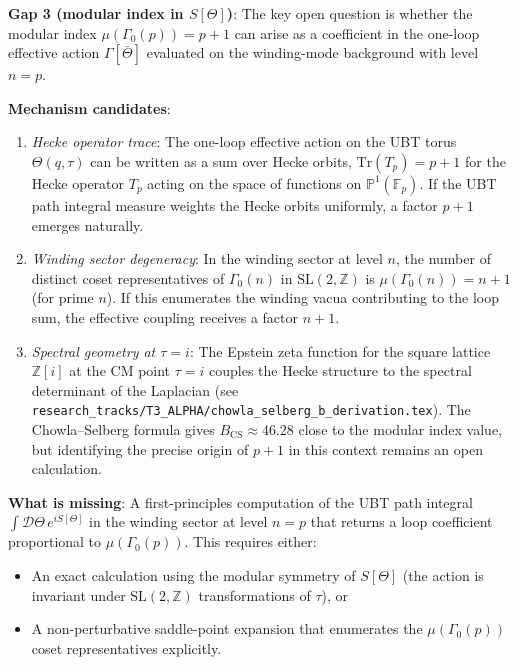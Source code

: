 \documentclass[12pt,a4paper]{article}
\theoremstyle{definition}
\theoremstyle{remark}
\begin{document}
\begin{gapbox}
\textbf{Gap 3 (modular index in $S[\Theta]$)}: The key open question is whether
the modular index $\mu(\Gamma_0(p)) = p+1$ can arise as a coefficient in the
one-loop effective action $\Gamma[\bar\Theta]$ evaluated on the winding-mode
background with level $n = p$.

\textbf{Mechanism candidates}:
\begin{enumerate}
  \item \textit{Hecke operator trace}: The one-loop effective action on the UBT
        torus $\Theta(q,\tau)$ can be written as a sum over Hecke orbits,
        $\mathrm{Tr}(T_p) = p + 1$ for the Hecke operator $T_p$ acting on the
        space of functions on $\mathbb{P}^1(\mathbb{F}_p)$.  If the UBT path
        integral measure weights the Hecke orbits uniformly, a factor $p+1$
        emerges naturally.
  \item \textit{Winding sector degeneracy}: In the winding sector at level $n$,
        the number of distinct coset representatives of $\Gamma_0(n)$ in
        $\mathrm{SL}(2,\mathbb{Z})$ is $\mu(\Gamma_0(n)) = n+1$ (for prime $n$).
        If this enumerates the winding vacua contributing to the loop sum,
        the effective coupling receives a factor $n+1$.
  \item \textit{Spectral geometry at $\tau = i$}: The Epstein zeta function for
        the square lattice $\mathbb{Z}[i]$ at the CM point $\tau = i$ couples
        the Hecke structure to the spectral determinant of the Laplacian (see
        \texttt{research\_tracks/T3\_ALPHA/chowla\_selberg\_b\_derivation.tex}).
        The Chowla--Selberg formula gives $B_{\mathrm{CS}} \approx 46.28$ close
        to the modular index value, but identifying the precise origin of $p+1$
        in this context remains an open calculation.
\end{enumerate}

\textbf{What is missing}: A first-principles computation of the UBT path
integral $\int \mathcal{D}\Theta\, e^{iS[\Theta]}$ in the winding sector at
level $n = p$ that returns a loop coefficient proportional to $\mu(\Gamma_0(p))$.
This requires either:
\begin{itemize}
  \item An exact calculation using the modular symmetry of $S[\Theta]$ (the
        action is invariant under $\mathrm{SL}(2,\mathbb{Z})$ transformations
        of $\tau$), or
  \item A non-perturbative saddle-point expansion that enumerates the
        $\mu(\Gamma_0(p))$ coset representatives explicitly.
\end{itemize}
\end{gapbox}
\end{document}
